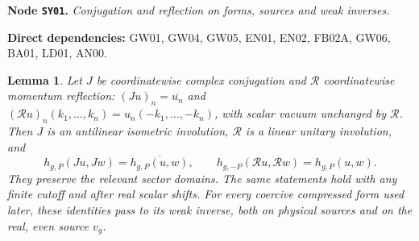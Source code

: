 \documentclass[11pt,a4paper]{article}
\newtheorem{lemma}[theorem]{Lemma}
\theoremstyle{remark}\newtheorem{remark}[theorem]{Remark}
\newcommand{\node}[3]{\par\Needspace{6\baselineskip}\smallskip\hypertarget{node:#1}{}\label{nodepage:#1}\noindent\textbf{Node \texttt{#1}.} \textit{#2.}\par\noindent\textbf{Direct dependencies:} #3.\par}
\begin{document}
\node{SY01}{Conjugation and reflection on forms, sources and weak inverses}{GW01, GW04, GW05, EN01, EN02, FB02A, GW06, BA01, LD01, AN00}
\begin{lemma}\label{lem:symmetrytransport}
Let $J$ be coordinatewise complex conjugation and $\mathcal R$ coordinatewise momentum reflection:
$(Ju)_n=\overline{u_n}$ and $(\mathcal Ru)_n(k_1,\ldots,k_n)=u_n(-k_1,\ldots,-k_n)$, with scalar vacuum unchanged by $\mathcal R$. Then $J$ is an antilinear isometric involution, $\mathcal R$ is a linear unitary involution, and
\[
 h_{g,P}(Ju,Jw)=\overline{h_{g,P}(u,w)},\qquad
 h_{g,-P}(\mathcal Ru,\mathcal Rw)=h_{g,P}(u,w).
\]
They preserve the relevant sector domains. The same statements hold with any finite cutoff and after real scalar shifts. For every coercive compressed form used later, these identities pass to its weak inverse, both on physical sources and on the real, even source $v_g$.
\end{lemma}
\end{document}
